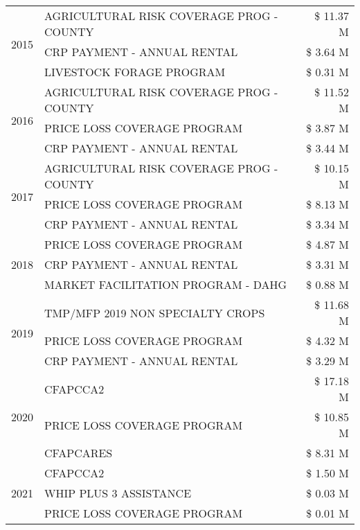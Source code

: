 \begin{tabular}{llr}
\cline{1-3}
\multirow[t]{3}{*}{2015} & AGRICULTURAL RISK COVERAGE PROG - COUNTY & \$ 11.37 M \\
 & CRP PAYMENT - ANNUAL RENTAL & \$ 3.64 M \\
 & LIVESTOCK FORAGE PROGRAM & \$ 0.31 M \\
\cline{1-3}
\multirow[t]{3}{*}{2016} & AGRICULTURAL RISK COVERAGE PROG - COUNTY & \$ 11.52 M \\
 & PRICE LOSS COVERAGE PROGRAM & \$ 3.87 M \\
 & CRP PAYMENT - ANNUAL RENTAL & \$ 3.44 M \\
\cline{1-3}
\multirow[t]{3}{*}{2017} & AGRICULTURAL RISK COVERAGE PROG - COUNTY & \$ 10.15 M \\
 & PRICE LOSS COVERAGE PROGRAM & \$ 8.13 M \\
 & CRP PAYMENT - ANNUAL RENTAL & \$ 3.34 M \\
\cline{1-3}
\multirow[t]{3}{*}{2018} & PRICE LOSS COVERAGE PROGRAM & \$ 4.87 M \\
 & CRP PAYMENT - ANNUAL RENTAL & \$ 3.31 M \\
 & MARKET FACILITATION PROGRAM - DAHG & \$ 0.88 M \\
\cline{1-3}
\multirow[t]{3}{*}{2019} & TMP/MFP 2019 NON SPECIALTY CROPS & \$ 11.68 M \\
 & PRICE LOSS COVERAGE PROGRAM & \$ 4.32 M \\
 & CRP PAYMENT - ANNUAL RENTAL & \$ 3.29 M \\
\cline{1-3}
\multirow[t]{3}{*}{2020} & CFAPCCA2 & \$ 17.18 M \\
 & PRICE LOSS COVERAGE PROGRAM & \$ 10.85 M \\
 & CFAPCARES & \$ 8.31 M \\
\cline{1-3}
\multirow[t]{3}{*}{2021} & CFAPCCA2 & \$ 1.50 M \\
 & WHIP PLUS 3 ASSISTANCE & \$ 0.03 M \\
 & PRICE LOSS COVERAGE PROGRAM & \$ 0.01 M \\
\cline{1-3}
\bottomrule
\end{tabular}

